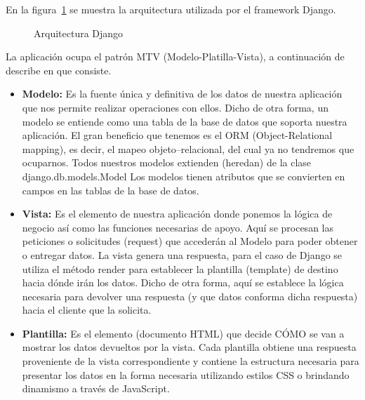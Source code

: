 \begin{itemize}
		En la figura~\ref{fig:django} se muestra la arquitectura utilizada por el framework Django.
		
		\begin{figure}[htbp!]
			\begin{center}
				\caption{Arquitectura Django}
				\label{fig:django}
			\end{center}
		\end{figure}
		
	\end{itemize}
	
	La aplicación ocupa el patrón MTV (Modelo-Platilla-Vista), a continuación de describe en que consiste.
	
	\begin{itemize}
		\item \textbf{Modelo:} Es la fuente única y definitiva de los datos de nuestra aplicación que nos permite realizar operaciones con ellos.
		Dicho de otra forma, un modelo se entiende como una tabla de la base de datos que soporta nuestra aplicación.
		El gran beneficio que tenemos es el ORM (Object-Relational mapping), es decir, el mapeo objeto–relacional, del cual ya no tendremos que ocuparnos.
		Todos nuestros modelos extienden (heredan) de la clase django.db.models.Model
		Los modelos tienen atributos que se convierten en campos en las tablas de la base de datos.
		
		\item \textbf{Vista:} Es el elemento de nuestra aplicación donde ponemos la lógica de negocio así como las funciones necesarias de apoyo.
		Aquí se procesan las peticiones o solicitudes (request) que accederán al Modelo para poder obtener o entregar datos.
		La vista genera una respuesta, para el caso de Django se utiliza el método render para establecer la plantilla (template) de destino hacia dónde irán los datos.
		Dicho de otra forma, aquí se establece la lógica necesaria para devolver una respuesta (y que datos conforma dicha respuesta) hacia el cliente que la solicita.
		
		\item \textbf{Plantilla:} Es el elemento (documento HTML) que decide CÓMO se van a mostrar los datos devueltos por la vista.
		Cada plantilla obtiene una respuesta proveniente de la vista correspondiente y contiene la estructura necesaria para presentar los datos en la forma necesaria utilizando estilos CSS o brindando dinamismo a través de JavaScript.
	\end{itemize}
	
